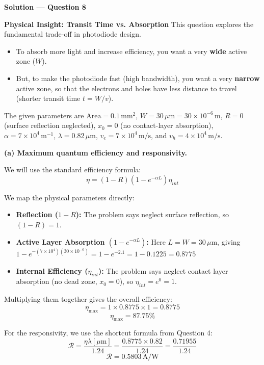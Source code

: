 \textbf{\large Solution --- Question 8}

\textbf{Physical Insight: Transit Time vs. Absorption}
This question explores the fundamental trade-off in photodiode design. 
\begin{itemize}
\item To absorb more light and increase efficiency, you want a very \textbf{wide} active zone ($W$).
\item But, to make the photodiode fast (high bandwidth), you want a very \textbf{narrow} active zone, so that the electrons and holes have less distance to travel (shorter transit time $t = W/v$).
\end{itemize}

The given parameters are $\text{Area} = 0.1\,\text{mm}^2$, $W = 30\,\mu\text{m} = 30\times10^{-6}\,\text{m}$, $R = 0$ (surface reflection neglected), $x_0 = 0$ (no contact-layer absorption), $\alpha = 7\times10^4\,\text{m}^{-1}$, $\lambda = 0.82\,\mu\text{m}$, $v_e = 7\times10^4\,\text{m/s}$, and $v_h = 4\times10^4\,\text{m/s}$.

\textbf{(a) Maximum quantum efficiency and responsivity.}

We will use the standard efficiency formula:
\begin{equation*}
  \eta = (1-R)(1 - e^{-\alpha L})\eta_{int}
\end{equation*}

We map the physical parameters directly:
\begin{itemize}
  \item \textbf{Reflection ($1-R$):} The problem says neglect surface reflection, so $(1 - R) = 1$.
  \item \textbf{Active Layer Absorption $(1 - e^{-\alpha L})$:} Here $L = W = 30\,\mu\text{m}$, giving $1 - e^{-(7\times10^4)(30\times10^{-6})} = 1 - e^{-2.1} = 1 - 0.1225 = 0.8775$
  \item \textbf{Internal Efficiency ($\eta_{int}$):} The problem says neglect contact layer absorption (no dead zone, $x_0 = 0$), so $\eta_{int} = e^0 = 1$.
\end{itemize}
Multiplying them together gives the overall efficiency:
\begin{equation*}
  \eta_{\max} = 1 \times 0.8775 \times 1 = 0.8775
\end{equation*}
\begin{equation*}
  \boxed{\eta_{\max} = 87.75\%}
\end{equation*}

For the responsivity, we use the shortcut formula from Question 4:
\begin{equation*}
  \mathcal{R} = \frac{\eta\lambda[\mu\text{m}]}{1.24} = \frac{0.8775 \times 0.82}{1.24} = \frac{0.71955}{1.24}
\end{equation*}
\begin{equation*}
  \boxed{\mathcal{R} = 0.5803\,\text{A/W}}
\end{equation*}

